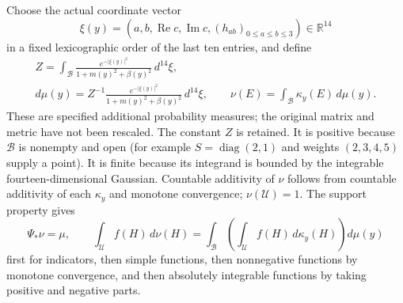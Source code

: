 Choose the actual coordinate vector
\[
 \xi(y)=(a,b,\operatorname{Re}c,\operatorname{Im}c,
                         (h_{ab})_{0\leq a\leq b\leq3})\in\mathbb R^{14}
\]
in a fixed lexicographic order of the last ten entries, and define
\begin{equation}\label{rm:concrete-measures}
 \begin{gathered}
 Z=\int_{\mathcal B}\frac{e^{-|\xi(y)|^2}}{1+m(y)^2+\beta(y)^2}\,d^{14}\xi,
 \\d\mu(y)=Z^{-1}
 \frac{e^{-|\xi(y)|^2}}{1+m(y)^2+\beta(y)^2}\,d^{14}\xi,\qquad
 \nu(E)=\int_{\mathcal B}\kappa_y(E)\,d\mu(y).
 \end{gathered}
\end{equation}
These are specified additional probability measures; the original
matrix and metric have not been rescaled. The constant $Z$ is retained.
It is positive because $\mathcal B$ is nonempty and open (for example
$S=\operatorname{diag}(2,1)$ and weights $(2,3,4,5)$ supply a point).
It is finite because its integrand is bounded by the integrable
fourteen-dimensional Gaussian. Countable additivity of $\nu$ follows
from countable additivity of each $\kappa_y$ and monotone convergence;
$\nu(\mathcal U)=1$. The support property gives
\begin{equation}\label{rm:pushforward}
 \Psi_*\nu=\mu,\qquad
 \int_{\mathcal U} f(H)\,d\nu(H)
 =\int_{\mathcal B}\left(\int_{\mathcal U}f(H)\,d\kappa_y(H)\right)d\mu(y)
\end{equation}
first for indicators, then simple functions, then nonnegative
functions by monotone convergence, and then absolutely integrable
functions by taking positive and negative parts.

